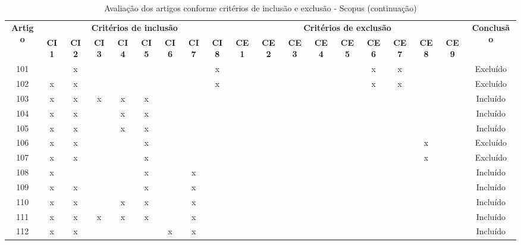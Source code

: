 \documentclass[
	12pt,				%
	oneside,			%
	a4paper,			%
	english,			%
	brazil				%
	]{abntex2ppgsi}
\begin{document}
\begin{apendicesenv}
\begin{table}[H]
\centering
\caption{Avaliação dos artigos conforme critérios de inclusão e exclusão - Scopus (continuação)}
\label{tab:critincluexclu_cont2} 
\setlength{\tabcolsep}{1.5pt} %
\footnotesize %
\begin{tabular}{c | c c c c c c c c | c c c c c c c c c | c}
\toprule
    \multirow{2}{*}{\textbf{Artigo}} & 
    \multicolumn{8}{c|}{\textbf{Critérios de inclusão}} &
    \multicolumn{9}{c|}{\textbf{Critérios de exclusão}} &
    \multirow{2}{*}{\textbf{Conclusão}} \\ 
    \cline{2-18}
 & \tiny\textbf{CI1} & \tiny\textbf{CI2} & \tiny\textbf{CI3} & \tiny\textbf{CI4} & \tiny\textbf{CI5} & \tiny\textbf{CI6} & \tiny\textbf{CI7} & \tiny\textbf{CI8} & \tiny\textbf{CE1} & \tiny\textbf{CE2} & \tiny\textbf{CE3} & \tiny\textbf{CE4} & \tiny\textbf{CE5} & \tiny\textbf{CE6} & \tiny\textbf{CE7} & \tiny\textbf{CE8} & \tiny\textbf{CE9} & \\
\midrule
101 &   & x &   &   &   &   &   & x &   &   &   &   &   & x & x &   &   & Excluído \\
102 & x & x &   &   &   &   &   & x &   &   &   &   &   & x & x &   &   & Excluído \\
103 & x & x & x & x & x &   &   &   &   &   &   &   &   &   &   &   &   & Incluído \\
104 & x & x &   & x & x &   &   &   &   &   &   &   &   &   &   &   &   & Incluído \\
105 & x & x &   & x & x &   &   &   &   &   &   &   &   &   &   &   &   & Incluído \\
106 & x & x &   &   & x &   &   &   &   &   &   &   &   &   &   & x &   & Excluído \\
107 & x & x &   &   & x &   &   &   &   &   &   &   &   &   &   & x &   & Excluído \\
108 & x &   &   &   & x &   & x &   &   &   &   &   &   &   &   &   &   & Incluído \\
109 & x & x &   &   & x &   & x &   &   &   &   &   &   &   &   &   &   & Incluído \\
110 & x & x &   & x & x &   & x &   &   &   &   &   &   &   &   &   &   & Incluído \\
111 & x & x & x & x & x &   & x &   &   &   &   &   &   &   &   &   &   & Incluído \\
112 & x & x &   &   &   & x & x &   &   &   &   &   &   &   &   &   &   & Incluído \\

\end{tabular}
\end{table}
\end{apendicesenv}
\end{document}
